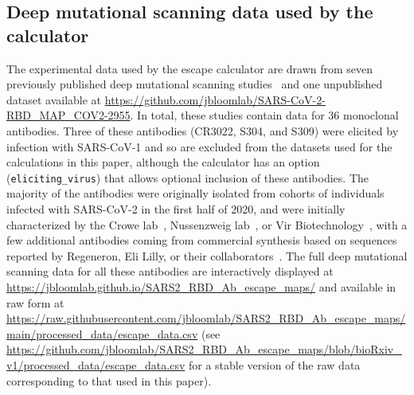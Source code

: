 \documentclass[9pt,twocolumn,twoside]{gsajnl_modified}
\begin{document}
{\subsection{Deep mutational scanning data used by the calculator}
The experimental data used by the escape calculator are drawn from seven previously published deep mutational scanning studies~\citep{greaney2021complete,greaney2021mapping,starr2021prospective,starr2021complete,starr2021sars,dong2021genetic,tortorici2021broad} and one unpublished dataset available at \url{https://github.com/jbloomlab/SARS-CoV-2-RBD_MAP_COV2-2955}.
In total, these studies contain data for 36 monoclonal antibodies.
Three of these antibodies (CR3022, S304, and S309) were elicited by infection with SARS-CoV-1 and so are excluded from the datasets used for the calculations in this paper, although the calculator has an option (\texttt{eliciting\_virus}) that allows optional inclusion of these antibodies.
The majority of the antibodies were originally isolated from cohorts of individuals infected with SARS-CoV-2 in the first half of 2020, and were initially characterized by the Crowe lab~\citep{zost2020potently}, Nussenzweig lab~\citep{robbiani2020convergent}, or Vir Biotechnology~\citep{piccoli2020mapping}, with a few additional antibodies coming from commercial synthesis based on sequences reported by Regeneron, Eli Lilly, or their collaborators~\citep{hansen2020studies,jones2021neutralizing,shi2020human}.
The full deep mutational scanning data for all these antibodies are interactively displayed at \url{https://jbloomlab.github.io/SARS2_RBD_Ab_escape_maps/} and available in raw form at \url{https://raw.githubusercontent.com/jbloomlab/SARS2_RBD_Ab_escape_maps/main/processed_data/escape_data.csv} (see \url{https://github.com/jbloomlab/SARS2_RBD_Ab_escape_maps/blob/bioRxiv_v1/processed_data/escape_data.csv} for a stable version of the raw data corresponding to that used in this paper).

}
\end{document}
